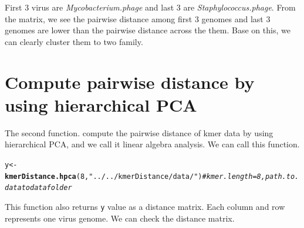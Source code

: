 \documentclass{article}\usepackage[]{graphicx}\usepackage[]{color}
\makeatletter
\newcommand{\hlnum}[1]{\textcolor[rgb]{0.686,0.059,0.569}{#1}}%
\newcommand{\hlstr}[1]{\textcolor[rgb]{0.192,0.494,0.8}{#1}}%
\newcommand{\hlcom}[1]{\textcolor[rgb]{0.678,0.584,0.686}{\textit{#1}}}%
\newcommand{\hlstd}[1]{\textcolor[rgb]{0.345,0.345,0.345}{#1}}%
\newcommand{\hlkwb}[1]{\textcolor[rgb]{0.69,0.353,0.396}{#1}}%
\newcommand{\hlkwd}[1]{\textcolor[rgb]{0.737,0.353,0.396}{\textbf{#1}}}%
\newenvironment{kframe}{%
 \def\at@end@of@kframe{}%
 \ifinner\ifhmode%
  \def\at@end@of@kframe{\end{minipage}}%
  \begin{minipage}{\columnwidth}%
 \fi\fi%
 \def\FrameCommand##1{\hskip\@totalleftmargin \hskip-\fboxsep
 \colorbox{shadecolor}{##1}\hskip-\fboxsep
     \hskip-\linewidth \hskip-\@totalleftmargin \hskip\columnwidth}%
 \MakeFramed {\advance\hsize-\width
   \@totalleftmargin\z@ \linewidth\hsize
   \@setminipage}}%
 {\par\unskip\endMakeFramed%
 \at@end@of@kframe}
\newenvironment{knitrout}{}{} %
\makeatother
\begin{document}
First 3 virus are \emph{Mycobacterium.phage} and last 3 are \emph{Staphylococcus.phage}. From the matrix, we see the pairwise distance among first 3 genomes and last 3 genomes are lower than the pairwise distance across the them. Base on this, we can clearly cluster them to two family.\\


\section{Compute pairwise distance by using hierarchical PCA}
\label{kmerDistance.hpca}

The second function.  compute the pairwise distance of kmer data by using hierarchical PCA, and we call it linear algebra analysis. We can call this function.

\begin{knitrout}
\color{fgcolor}\begin{kframe}
\begin{alltt}
\hlstd{y} \hlkwb{<-} \hlkwd{kmerDistance.hpca}\hlstd{(}\hlnum{8}\hlstd{,}\hlstr{"../../kmerDistance/data/"}\hlstd{)} \hlcom{#kmer.length = 8, path.to.data to data folder}
\end{alltt}
\end{kframe}
\end{knitrout}

This function also  returns \texttt{y} value as a distance matrix. Each column and row represents one virus genome. We can check the distance matrix.
\end{document}
